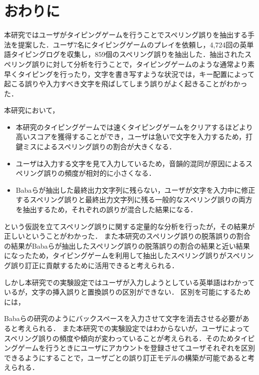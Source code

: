 \chapter{おわりに}
本研究ではユーザがタイピングゲームを行うことでスペリング誤りを抽出する手法を提案した．ユーザ7名にタイピングゲームのプレイを依頼し，4,724回の英単語タイピングログを収集し，859個のスペリング誤りを抽出した．抽出されたスペリング誤りに対して分析を行うことで，タイピングゲームのような通常より素早くタイピングを行ったり，文字を書き写すような状況では，キー配置によって起こる誤りや入力すべき文字を飛ばしてしまう誤りがよく起きることがわかった．

本研究において，

\begin{itemize}
 \item 本研究のタイピングゲームでは速くタイピングゲームをクリアするほどより高いスコアを獲得することができ，ユーザは急いで文字を入力するため，打鍵ミスによるスペリング誤りの割合が大きくなる．
 \item ユーザは入力する文字を見て入力しているため，音韻的混同が原因によるスペリング誤りの頻度が相対的に小さくなる．
 \item Babaらが抽出した最終出力文字列に残らない，ユーザが文字を入力中に修正するスペリング誤り\cite{babaACL2012}と最終出力文字列に残る一般的なスペリング誤りの両方を抽出するため，それぞれの誤りが混合した結果になる．
\end{itemize}

\noindent
という仮説を立てスペリング誤りに関する定量的な分析を行ったが，その結果が正しいということがわかった．
また本研究のスペリング誤りの脱落誤りの割合の結果がBabaらが抽出したスペリング誤りの脱落誤りの割合の結果\cite{babaACL2012}と近い結果になったため，タイピングゲームを利用して抽出したスペリング誤りがスペリング誤り訂正に貢献するために活用できると考えられる．

しかし本研究での実験設定ではユーザが入力しようとしている英単語はわかっているが，文字の挿入誤りと置換誤りの区別ができない．
区別を可能にするためには，
\begin{comment}
タイピングゲームにおいて入力した文字列が正しいかどうか判定するときにエンターキーを入力させて英単語に対応する文字列を明確にする，
\end{comment}
Babaらの研究\cite{babaACL2012}のようにバックスペースを入力させて文字を消去させる必要があると考えられる．
また本研究での実験設定ではわからないが，ユーザによってスペリング誤りの頻度や傾向が変わっていることが考えられる．そのためタイピングゲームを行うときにユーザにアカウントを登録させてユーザそれぞれを区別できるようにすることで，ユーザごとの誤り訂正モデルの構築が可能であると考えられる．

